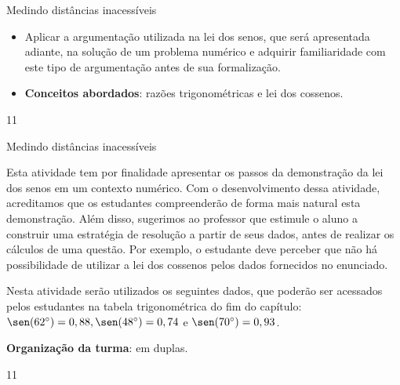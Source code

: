 \cleardoublepage
\def\currentcolor{session1}
\begin{objectives}{Medindo distâncias inacessíveis}
{
\begin{itemize}
\item Aplicar a argumentação utilizada na lei dos senos, que será apresentada adiante, na solução de um problema numérico e adquirir familiaridade com este tipo de argumentação antes de sua formalização.

\item \textbf{Conceitos abordados}: razões trigonométricas e lei dos cossenos.
\end{itemize}
}{1}{1}
\end{objectives}
\begin{sugestions}{Medindo distâncias inacessíveis}
{
Esta atividade tem por finalidade apresentar os passos da demonstração da lei dos senos em um contexto numérico. 
%
Com o desenvolvimento dessa atividade, acreditamos que os estudantes compreenderão de forma mais natural esta demonstração. 
%
Além disso, sugerimos ao professor que estimule o aluno a construir uma estratégia de resolução a partir de seus dados, antes de realizar os cálculos de uma questão. Por exemplo, o estudante deve perceber que não há possibilidade de utilizar a lei dos cossenos pelos dados fornecidos no enunciado.

Nesta atividade serão utilizados os seguintes dados, que poderão ser acessados pelos estudantes na tabela trigonométrica do fim do capítulo: $\sen(62^\circ)=0,88, \sen(48^\circ)=0,74$ e $\sen(70^\circ)=0,93$.

\textbf{Organização da turma}: em duplas.
}{1}{1}
\end{sugestions}
